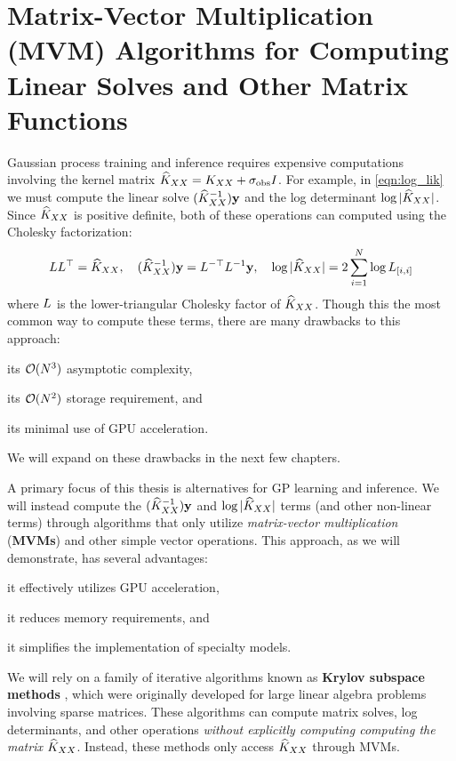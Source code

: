 \section{Matrix-Vector Multiplication (MVM) Algorithms for Computing Linear Solves and Other Matrix Functions}
\label{sec:mvms}

Gaussian process training and inference requires expensive computations involving the kernel matrix $\widehat{K}_{XX} = K_{XX} + \sigma_\text{obs} I$.
For example, in \cref{eqn:log_lik} we must compute the linear solve $(\widehat{K}_{XX}^{-1}) \mathbf{y}$ and the log determinant $\log \vert \widehat{K}_{XX} \vert$.
Since $\widehat{K}_{XX}$ is positive definite, both of these operations can computed using the Cholesky factorization:
%
\[
  L L^\top = \widehat{K}_{XX}, \quad
  (\widehat{K}_{XX}^{-1}) \mathbf{y} = L^{-\top} L^{-1} \mathbf{y}, \quad
  \log \vert \widehat{K}_{XX} \vert = 2 \sum_{i=1}^N \log L_{[i,i]}
\]
%
where $L$ is the lower-triangular Cholesky factor of $\widehat{K}_{XX}$.
Though this the most common way to compute these terms, there are many drawbacks to this approach:
%
\begin{enumerate*}
  \item its $\bigo{N^3}$ asymptotic complexity,
  \item its $\bigo{N^2}$ storage requirement, and
  \item its minimal use of GPU acceleration.
\end{enumerate*}
%
We will expand on these drawbacks in the next few chapters.

A primary focus of this thesis is alternatives for GP learning and inference.
We will instead compute the $(\widehat{K}_{XX}^{-1}) \mathbf{y}$ and $\log \vert \widehat{K}_{XX} \vert$ terms (and other non-linear terms) through algorithms that only utilize \emph{matrix-vector multiplication} ({\bf MVMs}) and other simple vector operations.
This approach, as we will demonstrate, has several advantages:
%
\begin{enumerate*}
  \item it effectively utilizes GPU acceleration,
  \item it reduces memory requirements, and
  \item it simplifies the implementation of specialty models.
\end{enumerate*}
%
We will rely on a family of iterative algorithms known as {\bf Krylov subspace methods} \citep[e.g.][]{saad2003iterative,van2003iterative}, which were originally developed for large linear algebra problems involving sparse matrices.
These algorithms can compute matrix solves, log determinants, and other operations \emph{without explicitly computing computing the matrix} $\widehat{K}_{XX}$.
Instead, these methods only access $\widehat{K}_{XX}$ through MVMs.

